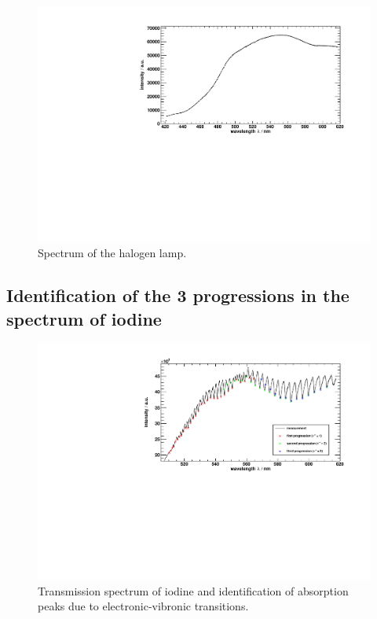 \begin{figure}[H]
\begin{center}
  \includegraphics[width=\textwidth]{../img/halogen_lamp.pdf}
  \caption[---]{Spectrum of the halogen lamp.}
  \label{img:hal:spectrum}
\end{center}
\end{figure}




\subsection{Identification of the 3 progressions in the spectrum of iodine}

\begin{figure}[H]
\begin{center}
  \includegraphics[width=\textwidth]{../img/I2_absorption.pdf}
  \caption[---]{Transmission spectrum of iodine and identification of absorption peaks due
  to electronic-vibronic transitions.}
  \label{img:spectrumiodine}
\end{center}
\end{figure}

